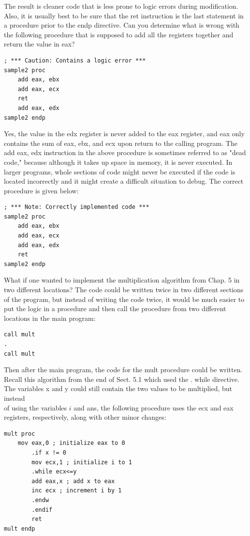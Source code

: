 \documentclass[10pt]{book}
\begin{document}
The result is cleaner code that is less prone to logic errors during modification. Also, it is usually best to be sure that the ret instruction is the last statement in a procedure prior to the endp directive. Can you determine what is wrong with the following procedure that is supposed to add all the registers together and return the value in eax?

\begin{verbatim}
; *** Caution: Contains a logic error ***
sample2 proc
    add eax, ebx
    add eax, ecx
    ret
    add eax, edx
sample2 endp
\end{verbatim}

Yes, the value in the edx register is never added to the eax register, and eax only contains the sum of eax, ebx, and ecx upon return to the calling program. The add eax, edx instruction in the above procedure is sometimes referred to as "dead code," because although it takes up space in memory, it is never executed. In larger programs, whole sections of code might never be executed if the code is located incorrectly and it might create a difficult situation to debug. The correct procedure is given below:

\begin{verbatim}
; *** Note: Correctly implemented code ***
sample2 proc
    add eax, ebx
    add eax, ecx
    add eax, edx
    ret
sample2 endp
\end{verbatim}

What if one wanted to implement the multiplication algorithm from Chap. 5 in two different locations? The code could be written twice in two different sections of the program, but instead of writing the code twice, it would be much easier to put the logic in a procedure and then call the procedure from two different locations in the main program:

\begin{verbatim}
call mult
.
call mult
\end{verbatim}

Then after the main program, the code for the mult procedure could be written. Recall this algorithm from the end of Sect. 5.1 which used the . while directive. The variables x and y could still contain the two values to be multiplied, but instead\\
of using the variables $i$ and ans, the following procedure uses the ecx and eax registers, respectively, along with other minor changes:


\begin{verbatim}
mult proc
    mov eax,0 ; initialize eax to 0
        .if x != 0
        mov ecx,1 ; initialize i to 1
        .while ecx<=y
        add eax,x ; add x to eax
        inc ecx ; increment i by 1
        .endw
        .endif
        ret
mult endp
\end{verbatim}
\end{document}
